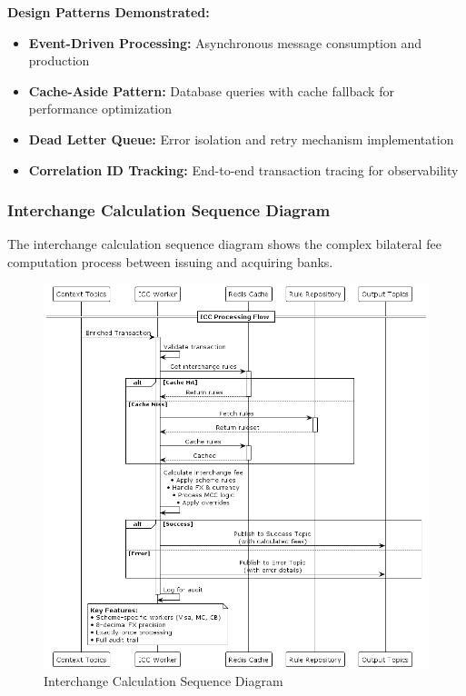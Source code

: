 \textbf{Design Patterns Demonstrated:}
\begin{itemize}
    \item \textbf{Event-Driven Processing:} Asynchronous message consumption and production
    \item \textbf{Cache-Aside Pattern:} Database queries with cache fallback for performance optimization
    \item \textbf{Dead Letter Queue:} Error isolation and retry mechanism implementation
    \item \textbf{Correlation ID Tracking:} End-to-end transaction tracing for observability
\end{itemize}

\subsubsection{Interchange Calculation Sequence Diagram}

The interchange calculation sequence diagram shows the complex bilateral fee computation process between issuing and acquiring banks.

\begin{figure}[H]
    \centering
    \includegraphics[width=1.05\textwidth]{out/diagrams/plantuml/in/ic-sequence/P2S Interchange Fee Calculation Process.png}
    \caption{Interchange Calculation Sequence Diagram}
    \label{fig:interchange_calculation_sequence}
\end{figure}

